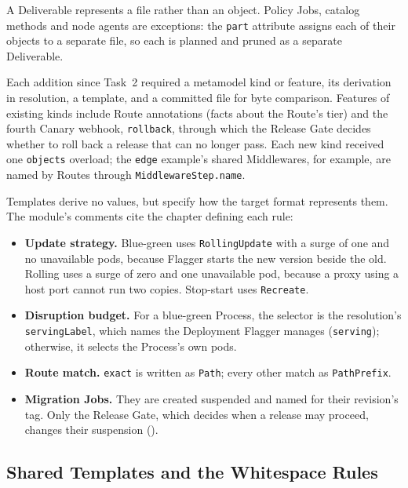 A Deliverable represents a file rather than an object. Policy Jobs, catalog methods and node agents
are exceptions: the \texttt{part} attribute assigns each of their objects to a
separate file, so each is planned and pruned as a separate Deliverable.

\label{sec:m2t-gaps}
Each addition since Task~2 required a metamodel
kind or feature, its derivation in resolution, a template, and a committed file for
byte comparison. Features of existing kinds include Route annotations (facts about the
Route's tier) and the fourth Canary webhook, \texttt{rollback}, through which the
Release Gate decides whether to roll back a release that can no longer pass. Each new
kind received one \texttt{objects} overload; the \texttt{edge} example's shared Middlewares, for example, are named by Routes through \texttt{MiddlewareStep.name}.

Templates derive no values, but specify how the target format represents them.
The module's comments cite the chapter defining each rule:

\begin{itemize}
  \item \textbf{Update strategy.} Blue-green uses \texttt{RollingUpdate} with a surge of
    one and no unavailable pods, because Flagger starts the new version beside the old.
    Rolling uses a surge of zero and one unavailable pod, because a proxy using a host
    port cannot run two copies. Stop-start uses \texttt{Recreate}.
  \item \textbf{Disruption budget.} For a blue-green Process, the selector is the resolution's
    \texttt{servingLabel}, which names the Deployment Flagger manages
    (\texttt{serving}); otherwise, it selects the Process's own pods.
  \item \textbf{Route match.} \texttt{exact} is written as \texttt{Path}; every other match
    as \texttt{PathPrefix}.
  \item \textbf{Migration Jobs.} They are created suspended and named for their
    revision's tag. Only the Release Gate, which decides when a release may proceed,
    changes their suspension ().
\end{itemize}

\subsection{Shared Templates and the Whitespace Rules}
\label{sec:m2t-fragments}

